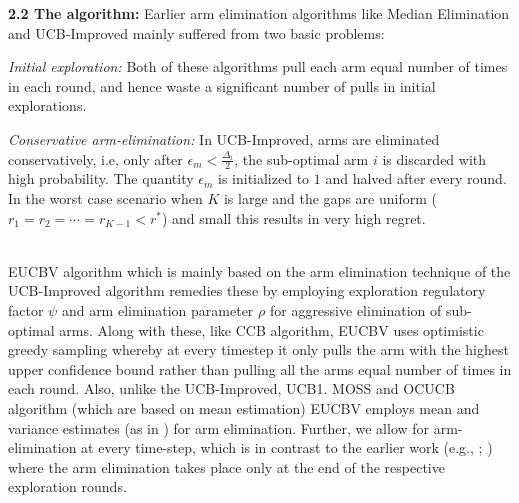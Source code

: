 \textbf{2.2 The algorithm:} Earlier arm elimination algorithms like Median Elimination \cite{even2006action} and UCB-Improved \cite{auer2010ucb} mainly suffered from two basic problems: \\
\begin{inparaenum}[\bfseries(i)]
\item \textit{Initial exploration:} Both of these algorithms pull each arm equal number of times in each round, and hence waste a significant number of pulls in initial explorations. \\
\item \textit{Conservative arm-elimination:} In UCB-Improved, arms are eliminated conservatively, i.e, only after $\epsilon_{m}<\frac{\Delta_{i}}{2}$, the sub-optimal arm $i$ is discarded with high probability. The quantity $\epsilon_{m}$ is initialized to $1$ and halved after every round. In the worst case scenario when $K$ is large and the gaps are uniform  ($r_{1}=r_{2}=\cdots=r_{K-1}<r^{*}$) and small this results in very high regret.\\
\end{inparaenum}
\\
	EUCBV algorithm which is mainly based on the arm elimination technique of the UCB-Improved algorithm remedies these by employing exploration regulatory factor $\psi$ and arm elimination parameter $\rho$ for aggressive elimination of sub-optimal arms. Along with these, like CCB \cite{liu2016modification} algorithm, EUCBV uses optimistic greedy sampling whereby at every timestep it only pulls the arm with the highest upper confidence bound rather than pulling all the arms equal number of times in each round. Also, unlike the UCB-Improved, UCB1. MOSS and OCUCB algorithm (which are based on mean estimation) EUCBV employs mean and variance estimates (as in \citet{audibert2009exploration}) for arm elimination. Further, we allow for arm-elimination at every time-step, which is in contrast to the earlier work (e.g., \cite{auer2010ucb}; \cite{even2006action}) where the arm elimination takes place only at the end of the respective exploration rounds. 




